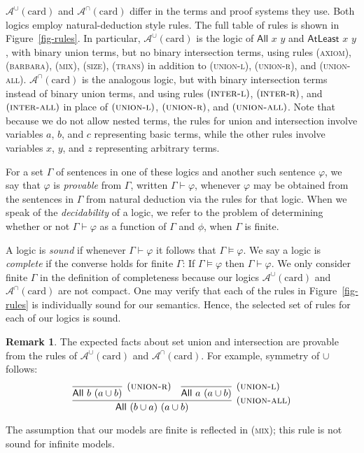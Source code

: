 \documentclass[letterpaper]{article} %
\theoremstyle{definition}
\newtheorem{remark}[theorem]{Remark}
\newcommand{\proves}{\vdash}
\newcommand{\Aunion}{\mathscr{A}^{\cup}}
\newcommand{\Ainter}{\mathscr{A}^{\cap}}
\newcommand{\proverule}{\textsc}
\newcommand{\axiom}{\proverule{axiom}}
\newcommand{\barbara}{\proverule{barbara}}
\newcommand{\unionl}{\proverule{union-l}}
\newcommand{\unionr}{\proverule{union-r}}
\newcommand{\unionall}{\proverule{union-all}}
\newcommand{\interl}{\proverule{inter-l}}
\newcommand{\interr}{\proverule{inter-r}}
\newcommand{\interall}{\proverule{inter-all}}
\newcommand{\mix}{\proverule{mix}}
\newcommand{\size}{\proverule{size}}
\newcommand{\trans}{\proverule{trans}}
\newcommand{\All}[2]{\mathsf{All}\,\,#1\,\,#2}
\newcommand{\Atleast}[2]{\mathsf{AtLeast}\,\,#1\,\,#2}
\newcommand{\card}{\mathrm{card}}
\begin{document}
$\Aunion(\card)$ and $\Ainter(\card)$ differ in the terms and proof systems they use. Both logics employ natural-deduction style rules.  The full table of rules is shown in Figure~\ref{fig-rules}.  In particular, $\Aunion(\card)$ is the logic of $\All{x}{y}$ and $\Atleast{x}{y}$, with binary union terms, but no binary intersection terms, using rules (\axiom), (\barbara), (\mix), (\size), (\trans) in addition to (\unionl), (\unionr), and (\unionall).
$\Ainter(\card)$ is the analogous logic, but with binary intersection terms instead of binary union terms, and using rules $(\interl)$, $(\interr)$, and $(\interall)$ in place of $(\unionl)$, $(\unionr)$, and $(\unionall)$. Note that because we do not allow nested terms, the rules for union and intersection involve variables $a$, $b$, and $c$ representing basic terms, while the other rules involve variables $x$, $y$, and $z$ representing arbitrary terms. 

For a set $\Gamma$ of sentences in one of these logics and another such sentence $\varphi$, we say that $\varphi$ is \emph{provable} from $\Gamma$, written  $\Gamma \proves \varphi$, whenever $\varphi$ may be obtained from the sentences in $\Gamma$ from natural deduction via the rules for that logic.  
When we speak of the \emph{decidability} of a logic, we refer to the problem of determining whether or not $\Gamma \proves \varphi$ as a function of $\Gamma$ and $\phi$, when $\Gamma$ is finite. 

A logic is \emph{sound} if whenever $\Gamma \proves \varphi$ it follows that $\Gamma \models \varphi$.  We say a logic is \emph{complete} if the converse holds for finite $\Gamma$:  If 
$\Gamma \models \varphi$ then $\Gamma \proves \varphi$. We only consider finite $\Gamma$ in the definition of completeness because our logics $\Aunion(\card)$ and $\Ainter(\card)$ are not compact. 
One may verify that each of the rules in Figure~\ref{fig-rules} is individually sound for our semantics.  Hence, the selected set of rules for each of our logics is sound.

\begin{remark}
The expected facts about set union and intersection are provable from the rules of $\Aunion(\card)$ and $\Ainter(\card)$.  For example, symmetry of $\cup$ follows:
$$
\infer[(\unionall)]{\All{(b\cup a)}{(a\cup b)}}{
\infer[(\unionr)]{\All{b}{(a\cup b)}}{} & 
\infer[(\unionl)]{\All{a}{(a\cup b)}}{}}
$$

The assumption that our models are finite is reflected in (\mix); this rule is not sound for infinite models.
\end{remark}
\end{document}
